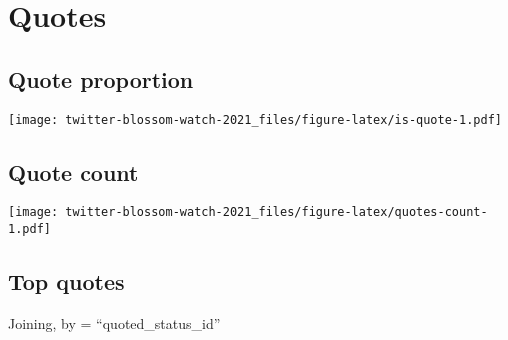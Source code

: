 \documentclass[
]{article}
\begin{document}
\hypertarget{quotes}{%
\section{Quotes}\label{quotes}}

\hypertarget{quote-proportion}{%
\subsection{Quote proportion}\label{quote-proportion}}

\texttt{[image: twitter-blossom-watch-2021\_files/figure-latex/is-quote-1.pdf]}

\hypertarget{quote-count}{%
\subsection{Quote count}\label{quote-count}}

\texttt{[image: twitter-blossom-watch-2021\_files/figure-latex/quotes-count-1.pdf]}

\hypertarget{top-quotes}{%
\subsection{Top quotes}\label{top-quotes}}

Joining, by = ``quoted\_status\_id''
\end{document}
